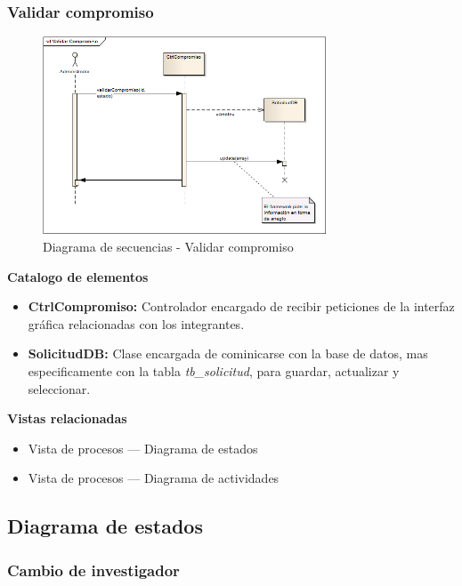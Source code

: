 \documentclass[12pt,oneside,letterpaper]{report}
\begin{document}
\subsubsection{Validar compromiso}

\begin{figure}[h!]
  \centering
    \includegraphics[width=0.75\textwidth]{./img/img18.png}
  \caption{Diagrama de secuencias - Validar compromiso}
\end{figure}

\textbf{Catalogo de elementos}
\begin{itemize}
 \item \textbf{CtrlCompromiso:} Controlador encargado de recibir peticiones de la interfaz gráfica relacionadas con los integrantes.
 \item \textbf{SolicitudDB:} Clase encargada de cominicarse con la base de datos, mas especificamente con la tabla \textit{tb\_solicitud}, para guardar, actualizar y seleccionar.
\end{itemize}

\textbf{Vistas relacionadas}
\begin{itemize}
 \item Vista de procesos --- Diagrama de estados
 \item Vista de procesos --- Diagrama de actividades
\end{itemize}


\subsection{Diagrama de estados}


\subsubsection{Cambio de investigador}
\end{document}
